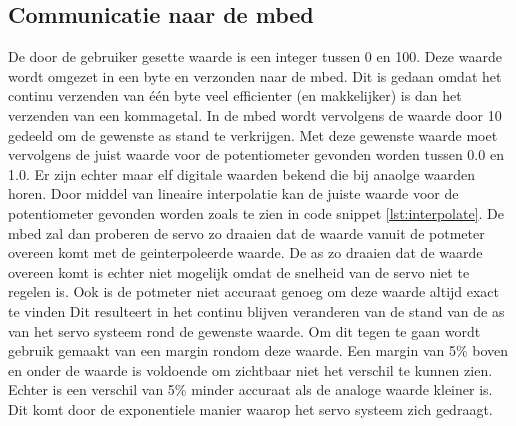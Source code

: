 \documentclass[a4paper]{article}
\begin{document}
		\subsection{Communicatie naar de mbed}
			De door de gebruiker gesette waarde is een integer tussen 0 en 100. Deze waarde wordt omgezet in een byte en verzonden naar de mbed. Dit is gedaan omdat het continu verzenden van \'e\'en byte veel efficienter (en makkelijker) is dan het verzenden van een kommagetal. In de mbed wordt vervolgens de waarde door 10 gedeeld om de gewenste as stand te verkrijgen. Met deze gewenste waarde moet vervolgens de juist waarde voor de potentiometer gevonden worden tussen 0.0 en 1.0. Er zijn echter maar elf digitale waarden bekend die bij anaolge waarden horen. Door middel van lineaire interpolatie kan de juiste waarde voor de potentiometer gevonden worden zoals te zien in code snippet \ref{lst:interpolate}. De mbed zal dan proberen de servo zo draaien dat de waarde vanuit de potmeter overeen komt met de geinterpoleerde waarde. De as zo draaien dat de waarde overeen komt is echter niet mogelijk omdat de snelheid van de servo niet te regelen is. Ook is de potmeter niet accuraat genoeg om deze waarde altijd exact te vinden Dit resulteert in het continu blijven veranderen van de stand van de as van het servo systeem rond de gewenste waarde. Om dit tegen te gaan wordt gebruik gemaakt van een margin rondom deze waarde. Een margin van 5\% boven en onder de waarde is voldoende om zichtbaar niet het verschil te kunnen zien. Echter is een verschil van 5\% minder accuraat als de analoge waarde kleiner is. Dit komt door de exponentiele manier waarop het servo systeem zich gedraagt.
\end{document}
